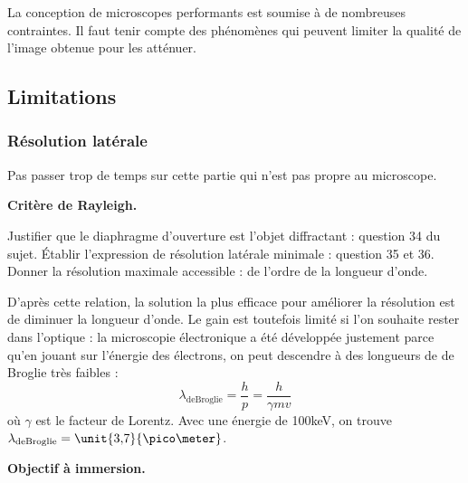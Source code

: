 \begin{transition}
La conception de microscopes performants est soumise à de nombreuses contraintes.
Il faut tenir compte des phénomènes qui peuvent limiter la qualité de l'image obtenue pour les atténuer.
\end{transition}

\subsection{Limitations}

\subsubsection{Résolution latérale}

Pas passer trop de temps sur cette partie qui n'est pas propre au microscope.

\begin{slide}
\textbf{Critère de Rayleigh.}
\end{slide} 

Justifier que le diaphragme d'ouverture est l'objet diffractant : question 34 du sujet.
Établir l'expression de résolution latérale minimale : question 35 et 36.
Donner la résolution maximale accessible : de l'ordre de la longueur d'onde.
\begin{remarque}
D'après cette relation, la solution la plus efficace pour améliorer la résolution est de diminuer la longueur d'onde.
Le gain est toutefois limité si l'on souhaite rester dans l'optique : la microscopie électronique a été développée justement parce qu'en jouant sur l'énergie des électrons, on peut descendre à des longueurs de de Broglie très faibles :
\begin{equation}
\lambda_\mathrm{deBroglie} = \frac{h}{p} = \frac{h}{\gamma mv}
\end{equation}
où $\gamma$ est le facteur de Lorentz.
Avec une énergie de \unit{100}{keV}, on trouve $\lambda_\mathrm{deBroglie}=\unit{3{,}7}{\pico\meter}$.
\end{remarque}

\begin{slide}
\textbf{Objectif à immersion.}
\end{slide}

